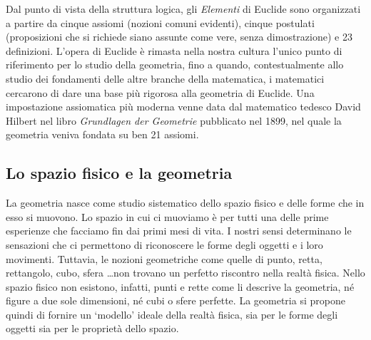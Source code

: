 Dal punto di vista della struttura logica, gli \emph{Elementi} di Euclide sono organizzati a partire da cinque assiomi (nozioni comuni evidenti), cinque postulati (proposizioni che si richiede siano assunte come vere, senza dimostrazione) e 23 definizioni. L’opera di Euclide è rimasta nella nostra cultura l’unico punto di riferimento per lo studio della geometria, fino a quando, contestualmente allo studio dei fondamenti delle altre branche della matematica, i matematici cercarono di dare una base più rigorosa alla geometria di Euclide. Una impostazione assiomatica più moderna venne data dal matematico tedesco David Hilbert nel libro \emph{Grundlagen der Geometrie} pubblicato nel 1899, nel quale la geometria veniva fondata su ben 21 assiomi.

\subsection{Lo spazio fisico e la geometria}
La geometria nasce come studio sistematico dello spazio fisico e delle forme che in esso si muovono. Lo spazio in cui ci muoviamo è per tutti una delle prime esperienze che facciamo fin dai primi mesi di vita. I nostri sensi determinano le sensazioni che ci permettono di riconoscere le forme degli oggetti e i loro movimenti. Tuttavia, le nozioni geometriche come quelle di punto, retta, rettangolo, cubo, sfera \ldots non trovano un perfetto riscontro nella realtà fisica. Nello spazio fisico non esistono, infatti, punti e rette come li descrive la geometria, né figure a due sole dimensioni, né cubi o sfere perfette. La geometria si propone quindi di fornire un ‘modello’ ideale della realtà fisica, sia per le forme degli oggetti sia per le proprietà dello spazio. 

